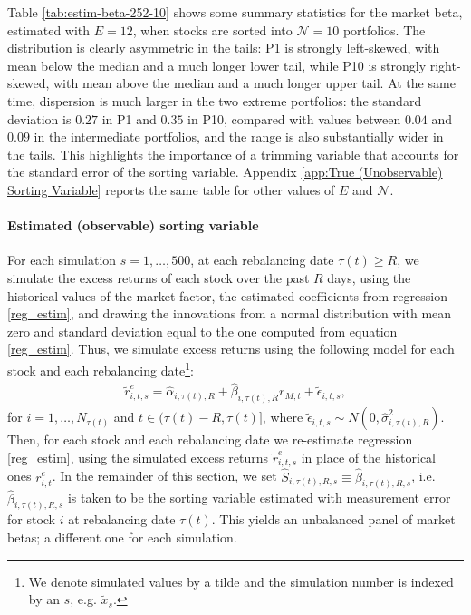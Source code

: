 Table \ref{tab:estim-beta-252-10} shows some summary statistics for the market beta, estimated with $E=12$, when stocks are sorted into $\mathcal{N}=10$ portfolios. The distribution is clearly asymmetric in the tails: P1 is strongly left-skewed, with mean below the median and a much longer lower tail, while P10 is strongly right-skewed, with mean above the median and a much longer upper tail. At the same time, dispersion is much larger in the two extreme portfolios: the standard deviation is $0.27$ in P1 and $0.35$ in P10, compared with values between $0.04$ and $0.09$ in the intermediate portfolios, and the range is also substantially wider in the tails. This highlights the importance of a trimming variable that accounts for the standard error of the sorting variable. Appendix \ref{app:True (Unobservable) Sorting Variable} reports the same table for other values of $E$ and $\mathcal{N}$.

 

\paragraph{Estimated (observable) sorting variable} For each simulation $s=1,\dots,500$, at each rebalancing date $\tau(t) \geq R$, we simulate the excess returns of each stock over the past $R$ days, using the historical values of the market factor, the estimated coefficients from regression \eqref{reg_estim}, and drawing the innovations from a normal distribution with mean zero and standard deviation equal to the one computed from equation \eqref{reg_estim}. Thus, we simulate excess returns using the following model for each stock and each rebalancing date\footnote{We denote simulated values by a tilde and the simulation number is indexed by an $s$, e.g. $\widetilde{x}_s$.}:
\begin{align*}
   \widetilde{r}_{i,t,s}^e = \widehat{\alpha}_{i,\tau(t),R} + \widehat{\beta}_{i,\tau(t),R} r_{M,t} + \widetilde{\epsilon}_{i,t,s},
\end{align*}
for $i=1, \dots, N_{\tau(t)}$ and $t \in (\tau(t)-R, \tau(t)]$, where $\widetilde{\epsilon}_{i,t,s} \sim N(0, \widehat{\sigma}_{i,\tau(t),R}^2)$. Then, for each stock and each rebalancing date we re-estimate regression \eqref{reg_estim}, using the simulated excess returns $\widetilde{r}_{i,t,s}^e$ in place of the historical ones $r_{i,t}^e$. In the remainder of this section, we set $\widehat{S}_{i,\tau(t),R,s} \equiv \widehat{\beta}_{i,\tau(t),R,s}$, i.e. $\widehat{\beta}_{i,\tau(t),R,s}$ is taken to be the sorting variable estimated with measurement error for stock $i$ at rebalancing date $\tau(t)$. This yields an unbalanced panel of market betas; a different one for each simulation.

